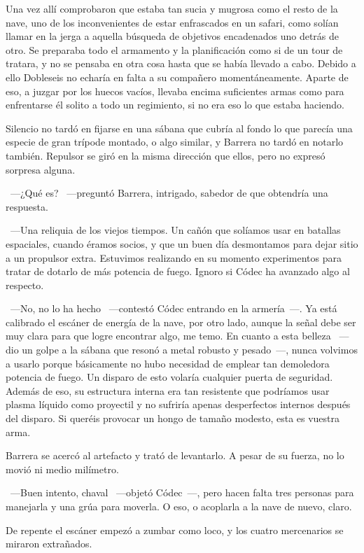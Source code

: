 Una vez allí comprobaron que estaba tan sucia y mugrosa como el resto de la nave, uno de los inconvenientes de estar enfrascados en un safari, como solían llamar en la jerga a aquella búsqueda de objetivos encadenados uno detrás de otro. Se preparaba todo el armamento y la planificación como si de un tour de tratara, y no se pensaba en otra cosa hasta que se había llevado a cabo. Debido a ello Dobleseis no echaría en falta a su compañero momentáneamente. Aparte de eso, a juzgar por los huecos vacíos, llevaba encima suficientes armas como para enfrentarse él solito a todo un regimiento, si no era eso lo que estaba haciendo.

Silencio no tardó en fijarse en una sábana que cubría al fondo lo que parecía una especie de gran trípode montado, o algo similar, y Barrera no tardó en notarlo también. Repulsor se giró en la misma dirección que ellos, pero no expresó sorpresa alguna.

~---¿Qué es? ~---preguntó Barrera, intrigado, sabedor de que obtendría una respuesta.

~---Una reliquia de los viejos tiempos. Un cañón que solíamos usar en batallas espaciales, cuando éramos socios, y que un buen día desmontamos para dejar sitio a un propulsor extra. Estuvimos realizando en su momento experimentos para tratar de dotarlo de más potencia de fuego. Ignoro si Códec ha avanzado algo al respecto.

~---No, no lo ha hecho ~---contestó Códec entrando en la armería~---. Ya está calibrado el escáner de energía de la nave, por otro lado, aunque la señal debe ser muy clara para que logre encontrar algo, me temo. En cuanto a esta belleza ~---dio un golpe a la sábana que resonó a metal robusto y pesado~---, nunca volvimos a usarlo porque básicamente no hubo necesidad de emplear tan demoledora potencia de fuego. Un disparo de esto volaría cualquier puerta de seguridad. Además de eso, su estructura interna era tan resistente que podríamos usar plasma líquido como proyectil y no sufriría apenas desperfectos internos después del disparo. Si queréis provocar un hongo de tamaño modesto, esta es vuestra arma.

Barrera se acercó al artefacto y trató de levantarlo. A pesar de su fuerza, no lo movió ni medio milímetro.

~---Buen intento, chaval ~---objetó Códec~---, pero hacen falta tres personas para manejarla y una grúa para moverla. O eso, o acoplarla a la nave de nuevo, claro.

De repente el escáner empezó a zumbar como loco, y los cuatro mercenarios se miraron extrañados.

